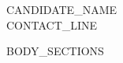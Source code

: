 \documentclass[letterpaper,10pt]{article}
\begin{document}
\begin{center}
    {\LARGE\scshape {{CANDIDATE_NAME}}} \\[3pt]
    \footnotesize {{CONTACT_LINE}}
\end{center}
\vspace{-8pt}

{{BODY_SECTIONS}}
\end{document}
